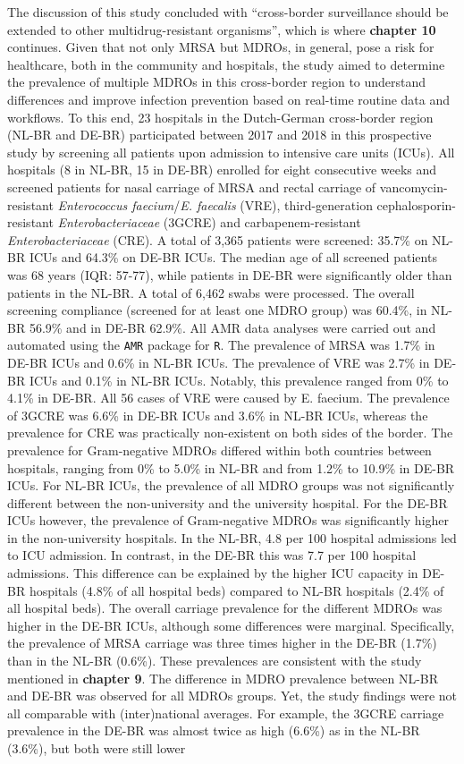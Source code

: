 \documentclass[
]{book}
\begin{document}
The discussion of this study concluded with ``cross-border surveillance should be extended to other multidrug-resistant organisms'', which is where \textbf{chapter 10} continues. Given that not only MRSA but MDROs, in general, pose a risk for healthcare, both in the community and hospitals, the study aimed to determine the prevalence of multiple MDROs in this cross-border region to understand differences and improve infection prevention based on real-time routine data and workflows. To this end, 23 hospitals in the Dutch-German cross-border region (NL-BR and DE-BR) participated between 2017 and 2018 in this prospective study by screening all patients upon admission to intensive care units (ICUs). All hospitals (8 in NL-BR, 15 in DE-BR) enrolled for eight consecutive weeks and screened patients for nasal carriage of MRSA and rectal carriage of vancomycin-resistant \emph{Enterococcus faecium}/\emph{E. faecalis} (VRE), third-generation cephalosporin-resistant \emph{Enterobacteriaceae} (3GCRE) and carbapenem-resistant \emph{Enterobacteriaceae} (CRE). A total of 3,365 patients were screened: 35.7\% on NL-BR ICUs and 64.3\% on DE-BR ICUs. The median age of all screened patients was 68 years (IQR: 57-77), while patients in DE-BR were significantly older than patients in the NL-BR. A total of 6,462 swabs were processed. The overall screening compliance (screened for at least one MDRO group) was 60.4\%, in NL-BR 56.9\% and in DE-BR 62.9\%. All AMR data analyses were carried out and automated using the \texttt{AMR} package for \texttt{R}. The prevalence of MRSA was 1.7\% in DE-BR ICUs and 0.6\% in NL-BR ICUs. The prevalence of VRE was 2.7\% in DE-BR ICUs and 0.1\% in NL-BR ICUs. Notably, this prevalence ranged from 0\% to 4.1\% in DE-BR. All 56 cases of VRE were caused by E. faecium. The prevalence of 3GCRE was 6.6\% in DE-BR ICUs and 3.6\% in NL-BR ICUs, whereas the prevalence for CRE was practically non-existent on both sides of the border. The prevalence for Gram-negative MDROs differed within both countries between hospitals, ranging from 0\% to 5.0\% in NL-BR and from 1.2\% to 10.9\% in DE-BR ICUs. For NL-BR ICUs, the prevalence of all MDRO groups was not significantly different between the non-university and the university hospital. For the DE-BR ICUs however, the prevalence of Gram-negative MDROs was significantly higher in the non-university hospitals. In the NL-BR, 4.8 per 100 hospital admissions led to ICU admission. In contrast, in the DE-BR this was 7.7 per 100 hospital admissions. This difference can be explained by the higher ICU capacity in DE-BR hospitals (4.8\% of all hospital beds) compared to NL-BR hospitals (2.4\% of all hospital beds). The overall carriage prevalence for the different MDROs was higher in the DE-BR ICUs, although some differences were marginal. Specifically, the prevalence of MRSA carriage was three times higher in the DE-BR (1.7\%) than in the NL-BR (0.6\%). These prevalences are consistent with the study mentioned in \textbf{chapter 9}. The difference in MDRO prevalence between NL-BR and DE-BR was observed for all MDROs groups. Yet, the study findings were not all comparable with (inter)national averages. For example, the 3GCRE carriage prevalence in the DE-BR was almost twice as high (6.6\%) as in the NL-BR (3.6\%), but both were still lower 
\end{document}
